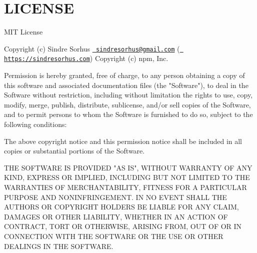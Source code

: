 \chapter{LICENSE}
\hypertarget{md_backend_2node__modules_2_0dnpmcli_2move-file_2_l_i_c_e_n_s_e}{}\label{md_backend_2node__modules_2_0dnpmcli_2move-file_2_l_i_c_e_n_s_e}
MIT License

Copyright (c) Sindre Sorhus \href{mailto:sindresorhus@gmail.com}{\texttt{ sindresorhus@gmail.\+com}} (\href{https://sindresorhus.com}{\texttt{ https\+://sindresorhus.\+com}}) Copyright (c) npm, Inc.

Permission is hereby granted, free of charge, to any person obtaining a copy of this software and associated documentation files (the "{}\+Software"{}), to deal in the Software without restriction, including without limitation the rights to use, copy, modify, merge, publish, distribute, sublicense, and/or sell copies of the Software, and to permit persons to whom the Software is furnished to do so, subject to the following conditions\+:

The above copyright notice and this permission notice shall be included in all copies or substantial portions of the Software.

THE SOFTWARE IS PROVIDED "{}\+AS IS"{}, WITHOUT WARRANTY OF ANY KIND, EXPRESS OR IMPLIED, INCLUDING BUT NOT LIMITED TO THE WARRANTIES OF MERCHANTABILITY, FITNESS FOR A PARTICULAR PURPOSE AND NONINFRINGEMENT. IN NO EVENT SHALL THE AUTHORS OR COPYRIGHT HOLDERS BE LIABLE FOR ANY CLAIM, DAMAGES OR OTHER LIABILITY, WHETHER IN AN ACTION OF CONTRACT, TORT OR OTHERWISE, ARISING FROM, OUT OF OR IN CONNECTION WITH THE SOFTWARE OR THE USE OR OTHER DEALINGS IN THE SOFTWARE. 